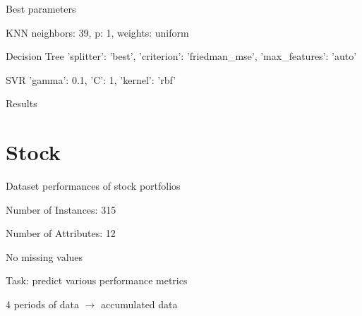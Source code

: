 \documentclass[12pt]{beamer}
\begin{document}
\begin{frame}{Best parameters}
\begin{block}{KNN}
neighbors: 39, p: 1, weights: uniform
\end{block}

\begin{block}{Decision Tree}
'splitter': 'best', 'criterion': 'friedman\_mse', 'max\_features': 'auto'
\end{block}

\begin{block}{SVR}
'gamma': 0.1, 'C': 1, 'kernel': 'rbf'
\end{block}
\end{frame}

\begin{frame}{Results}
\resizebox{\linewidth}{!}{}
\end{frame}

\section{Stock}
\begin{frame}{Dataset}
performances of stock portfolios

Number of Instances: 315

Number of Attributes: 12

No missing values

Task: predict various performance metrics

4 periods of data $\rightarrow$ accumulated data
\end{frame}
\end{document}
